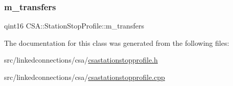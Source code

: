 \mbox{\label{classCSA_1_1StationStopProfile_a9616f115681c835b03975aab6bb3dfae}} 
\subsubsection{\texorpdfstring{m\+\_\+transfers}{m\_transfers}}
{\footnotesize\ttfamily qint16 C\+S\+A\+::\+Station\+Stop\+Profile\+::m\+\_\+transfers\hspace{0.3cm}{\ttfamily [private]}}



The documentation for this class was generated from the following files\+:\begin{DoxyCompactItemize}
\item 
src/linkedconnections/csa/\mbox{\hyperlink{csastationstopprofile_8h}{csastationstopprofile.\+h}}\item 
src/linkedconnections/csa/\mbox{\hyperlink{csastationstopprofile_8cpp}{csastationstopprofile.\+cpp}}\end{DoxyCompactItemize}
